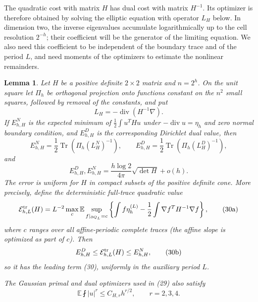 \documentclass{smfart}
\newtheorem{lemma}[theorem]{Lemma}
\theoremstyle{definition}
\newcommand{\1}{\mathbf 1}
\begin{document}
The quadratic cost with matrix $H$ has dual cost with matrix $H^{-1}$.
Its optimizer is therefore obtained by solving the elliptic equation
with operator $L_H$ below.  In dimension two, the inverse eigenvalues
accumulate logarithmically up to the cell resolution $2^{-h}$; their
coefficient will be the generator of the limiting equation.  We also
need this coefficient to be independent of the boundary trace and of
the period $L$, and need moments of the optimizers to estimate the
nonlinear remainders.

\begin{lemma}\label{lem:grouped-quadratic-generator}
Let $H$ be a positive definite $2\times2$ matrix and
$n=2^h$.  On the unit square let $\Pi_ h$ be orthogonal projection
onto functions constant on the $n^2$ small squares, followed by
removal of the constants, and put
\begin{equation*}
L_ H=-\operatorname {div}(H^{-1}\nabla).
\end{equation*}
If $E_ {h,H}^N$ is the expected minimum of
$\frac12\int u^THu$ under
$-\operatorname {div}u=\eta_ h$ and zero normal boundary condition,
and $E_ {h,H}^D$ is the corresponding Dirichlet dual value, then
\begin{equation}
E_ {h,H}^N=\frac12\operatorname {Tr}(\Pi_ h(L_ H^N)^{-1}),
\qquad
E_ {h,H}^D=\frac12\operatorname {Tr}(\Pi_ h(L_ H^D)^{-1}),
\tag{29}
\end{equation}
and
\begin{equation}
E_ {h,H}^D,E_ {h,H}^N
=\frac{h\log2}{4\pi}\sqrt{\det H}+o(h).
\tag{30}
\end{equation}
The error is uniform for $H$ in compact subsets of the positive
definite cone.  More precisely, define the deterministic full-trace
quadratic value
\begin{equation}
\mathcal E^{\rm tr}_ {h,L}(H)=L^{-2}\max_ c\mathbb E
\sup_ {f|_ {\partial Q_ L}=c}
\left\{\int f\eta_ h^{(L)}
-\frac12\int\nabla f^TH^{-1}\nabla f\right\},
\tag{30a}
\end{equation}
where $c$ ranges over all affine-periodic complete traces (the affine
slope is optimized as part of $c$).  Then
\begin{equation}
E_ {h,H}^D\leq\mathcal E^{\rm tr}_ {h,L}(H)\leq E_ {h,H}^N,
\tag{30b}
\end{equation}
so it has the leading term (30), uniformly in the auxiliary period
$L$.

The Gaussian primal and dual optimizers used in (29) also satisfy
\begin{equation}
\mathbb E\fint |u|^r\leq C_ {H,r}h^{r/2},\qquad r=2,3,4.
\tag{31}
\end{equation}

\end{lemma}
\end{document}
